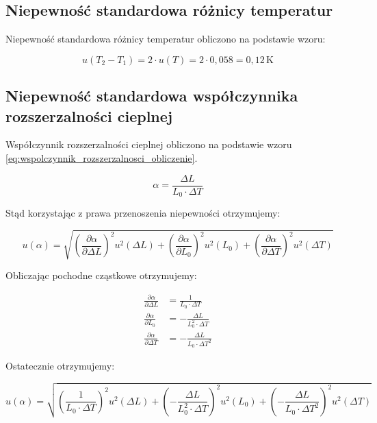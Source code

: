 \documentclass[a4paper,12pt]{article}
\begin{document}
\subsection{Niepewność standardowa różnicy temperatur}

Niepewność standardowa różnicy temperatur obliczono na podstawie wzoru:

\begin{equation*}
    u(T_2 - T_1) = 2 \cdot u(T) = 2 \cdot 0{,}058 = 0{,}12\,\text{K}
\end{equation*}


\subsection{Niepewność standardowa współczynnika rozszerzalności cieplnej}

Współczynnik rozszerzalności cieplnej obliczono na podstawie wzoru \ref{eq:wspolczynnik_rozszerzalnosci_obliczenie}.

\begin{equation*}
    \label{eq:wspolczynnik_rozszerzalnosci_obliczenie}
    \alpha = \frac{\Delta L}{L_0 \cdot \Delta T}
\end{equation*}

Stąd korzystając z prawa przenoszenia niepewności otrzymujemy:

\begin{equation*}
    u(\alpha) = \sqrt{\left( \frac{\partial \alpha}{\partial \Delta L} \right)^2 u^2(\Delta L) + \left( \frac{\partial \alpha}{\partial L_0} \right)^2 u^2(L_0) + \left( \frac{\partial \alpha}{\partial \Delta T} \right)^2 u^2(\Delta T)}
\end{equation*}

Obliczając pochodne cząstkowe otrzymujemy:

\begin{align*}
    \frac{\partial \alpha}{\partial \Delta L} & = \frac{1}{L_0 \cdot \Delta T}           \\
    \frac{\partial \alpha}{\partial L_0}      & = -\frac{\Delta L}{L_0^2 \cdot \Delta T} \\
    \frac{\partial \alpha}{\partial \Delta T} & = -\frac{\Delta L}{L_0 \cdot \Delta T^2}
\end{align*}

Ostatecznie otrzymujemy:

\begin{equation*}
    u(\alpha) = \sqrt{\left( \frac{1}{L_0 \cdot \Delta T} \right)^2 u^2(\Delta L) + \left( -\frac{\Delta L}{L_0^2 \cdot \Delta T} \right)^2 u^2(L_0) + \left( -\frac{\Delta L}{L_0 \cdot \Delta T^2} \right)^2 u^2(\Delta T)}
\end{equation*}
\end{document}
